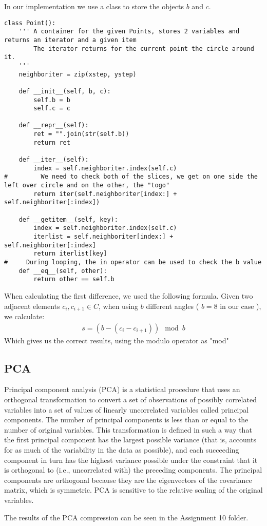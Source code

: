 In our implementation we use a class to store the objects $b$ and $c$.

\begin{verbatim}
class Point():
    ''' A container for the given Points, stores 2 variables and returns an iterator and a given item
        The iterator returns for the current point the circle around it.
    '''
    neighboriter = zip(xstep, ystep)
    
    def __init__(self, b, c):
        self.b = b
        self.c = c
        
    def __repr__(self):
        ret = "".join(str(self.b))
        return ret
    
    def __iter__(self):
        index = self.neighboriter.index(self.c)
#         We need to check both of the slices, we get on one side the left over circle and on the other, the "togo"
        return iter(self.neighboriter[index:] + self.neighboriter[:index])
    
    def __getitem__(self, key):
        index = self.neighboriter.index(self.c)
        iterlist = self.neighboriter[index:] + self.neighboriter[:index]
        return iterlist[key]
#     During looping, the in operator can be used to check the b value
    def __eq__(self, other):
        return other == self.b
\end{verbatim}


When calculating the first difference, we used the following formula.
Given two adjacent elements $c_i,c_{i+1} \in C$, when using $b$ different angles ( $b=8$ in our case ), we calculate:
\begin{gather*}
s = (b - ( c_i - c_{i+1} )) \mod b
\end{gather*}
Which gives us the correct results, using the modulo operator as "mod"

\subsection{PCA} 
Principal component analysis (PCA) is a statistical procedure that uses an orthogonal transformation to convert a set of observations of possibly correlated variables into a set of values of linearly uncorrelated variables called principal components. The number of principal components is less than or equal to the number of original variables. This transformation is defined in such a way that the first principal component has the largest possible variance (that is, accounts for as much of the variability in the data as possible), and each succeeding component in turn has the highest variance possible under the constraint that it is orthogonal to (i.e., uncorrelated with) the preceding components. The principal components are orthogonal because they are the eigenvectors of the covariance matrix, which is symmetric. PCA is sensitive to the relative scaling of the original variables.

The results of the PCA compression can be seen in the Assignment 10 folder.

